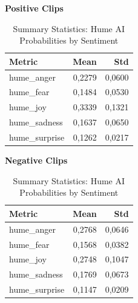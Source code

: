   
  \begin{table}[H]
    \centering
    \begin{subtable}{0.45\textwidth}
      \centering
      \caption*{\textbf{Positive Clips}}
      \begin{tabular}{lrr}
        \toprule
        \textbf{Metric}      & \textbf{Mean}  & \textbf{Std}   \\
        \midrule
            hume\_anger     & 0,2279 & 0,0600 \\
            hume\_fear      & 0,1484 & 0,0530 \\
            hume\_joy       & 0,3339 & 0,1321 \\
            hume\_sadness   & 0,1637 & 0,0650 \\
            hume\_surprise  & 0,1262 & 0,0217 \\
        \bottomrule
      \end{tabular}
    \end{subtable}\hfill
    \begin{subtable}{0.45\textwidth}
      \centering
      \caption*{\textbf{Negative Clips}}
      \begin{tabular}{lrr}
        \toprule
        \textbf{Metric}      & \textbf{Mean}  & \textbf{Std}   \\
        \midrule
            hume\_anger     & 0,2768 & 0,0646 \\
            hume\_fear      & 0,1568 & 0,0382 \\
            hume\_joy       & 0,2748 & 0,1047 \\
            hume\_sadness   & 0,1769 & 0,0673 \\
            hume\_surprise  & 0,1147 & 0,0209 \\
        \bottomrule
      \end{tabular}
    \end{subtable}
    \caption{Summary Statistics: Hume AI Probabilities by Sentiment}
    \label{tab:summary_hume_by_sentiment}
  \end{table}
  

